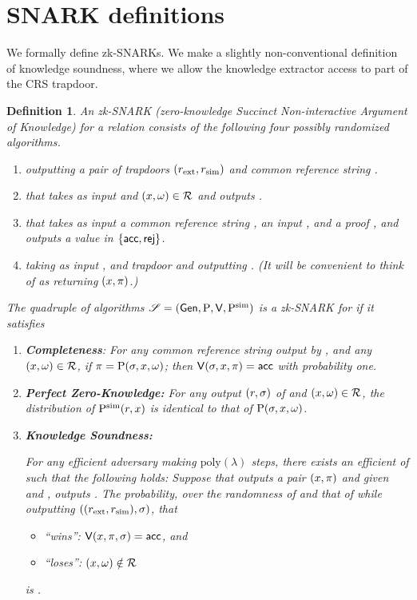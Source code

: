 \documentclass[11pt]{article}
\numberwithin{figure}{section} %
\newtheorem{dfn}[thm]{Definition}
\newcommand{\set}[1]{\ensuremath{\left\{#1\right\}}\xspace}
\newcommand{\poly}{\ensuremath{\mathrm{poly}(\lambda)}\xspace}
\begin{document}
\section{SNARK definitions}
We formally define zk-SNARKs.
We make a slightly non-conventional definition of knowledge soundness, where we allow the knowledge extractor access to
part of the CRS trapdoor.
\begin{dfn}\label{dfn:zkSNARK}
An zk-SNARK \snark (zero-knowledge Succinct Non-interactive Argument of Knowledge) for a relation \rel consists of the following four possibly randomized algorithms.
\begin{enumerate}
 \item \gen outputting a pair of trapdoors $(r_{\mathrm{ext}},r_{\mathrm{sim}})$ and common reference string \crs.
 \item \prv that takes as input \crs and $(x,\omega)\in \mathcal{R}$ and outputs
 \prf.
 \item \ver that takes as input a common reference string \crs, an input \inp, and a proof \prf, and outputs a value in \set{\acc,\rej}.
 \item \simprv taking as input \inp, and trapdoor \trapdoorsim and outputting  \prf.
 (It will be convenient to think of \simprv as returning $(x,\pi)$.)
\end{enumerate}

The quadruple of algorithms $\mathscr S = (\mathsf{Gen},\mathrm{P},\mathsf{V},\mathrm{P^{sim}})$ is a zk-SNARK for \rel if it satisfies

\begin{enumerate}
 \item \textbf{Completeness}: For any common reference string \crs output by \gen, and any $(x,\omega)\in \mathcal{R}$, if $\pi = \mathrm{P}(\sigma,x,\omega)$; then
 $\mathsf{V}(\sigma,x,\pi) = \mathsf{acc}$ with probability one.
\item \textbf{Perfect Zero-Knowledge:} For any output $(r,\sigma)$ of \gen and $(x,\omega)\in \mathcal{R}$, the distribution of $\mathrm{P^{sim}}(r,x)$
is identical to that of $\mathrm{P}(\sigma,x,\omega)$.

\item \textbf{Knowledge Soundness:}

For any efficient adversary \adv  making \poly steps, there exists an efficient  \ext of such that the following holds:
Suppose that \adv 
outputs a pair $(x,\pi)$ and \ext given \advrand and \trapdoorext,
outputs \wit.
The probability, over the randomness of \adv and that of \gen while outputting $((r_{\mathrm{ext}},r_{\mathrm{sim}}),\sigma)$,
 that 
\begin{itemize}
 \item \adv ``wins'': $\mathsf{V}(x,\pi,\sigma)=\mathsf{acc}$, and
 \item \ext ``loses'': $(x,\omega)\notin \mathcal{R}$
\end{itemize}
is \negl.
 \end{enumerate}
 
 \end{dfn}
 
\end{document}
